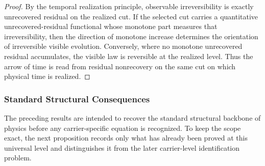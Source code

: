 \begin{proof}
By the temporal realization principle, observable irreversibility is exactly
unrecovered residual on the realized cut. If the selected cut carries a
quantitative unrecovered-residual functional whose monotone part measures that
irreversibility, then the direction of monotone increase determines the
orientation of irreversible visible evolution. Conversely, where no monotone
unrecovered residual accumulates, the visible law is reversible at the
realized level. Thus the arrow of time is read from residual nonrecovery on the
same cut on which physical time is realized.
\end{proof}

\subsubsection{Standard Structural Consequences}

The preceding results are intended to recover the standard structural backbone
of physics before any carrier-specific equation is recognized. To keep the
scope exact, the next proposition records only what has already been proved at
this universal level and distinguishes it from the later carrier-level
identification problem.

